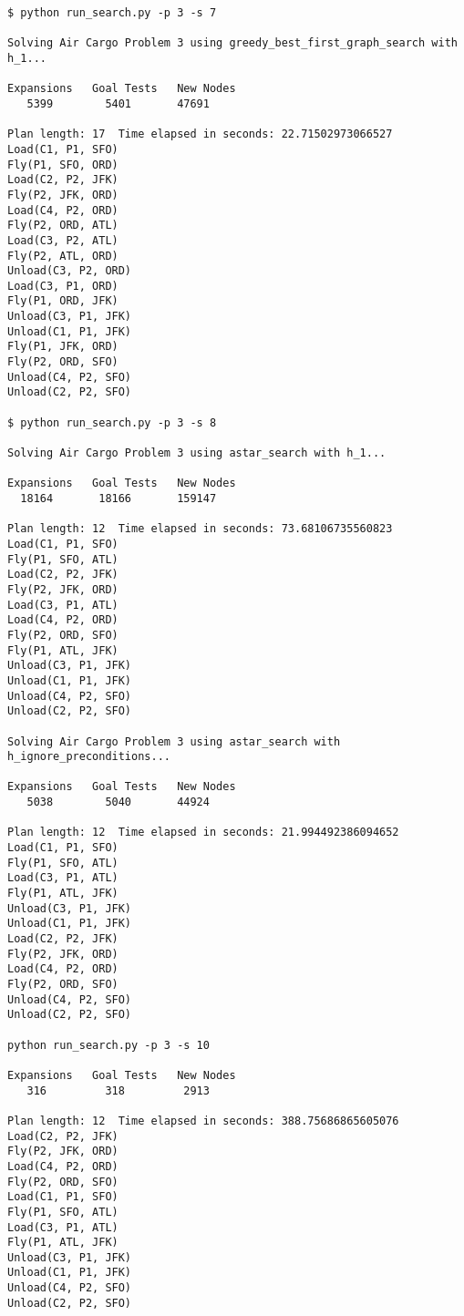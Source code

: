 \documentclass[11pt]{scrartcl}
\begin{document}
\begin{verbatim}
$ python run_search.py -p 3 -s 7

Solving Air Cargo Problem 3 using greedy_best_first_graph_search with h_1...

Expansions   Goal Tests   New Nodes
   5399        5401       47691

Plan length: 17  Time elapsed in seconds: 22.71502973066527
Load(C1, P1, SFO)
Fly(P1, SFO, ORD)
Load(C2, P2, JFK)
Fly(P2, JFK, ORD)
Load(C4, P2, ORD)
Fly(P2, ORD, ATL)
Load(C3, P2, ATL)
Fly(P2, ATL, ORD)
Unload(C3, P2, ORD)
Load(C3, P1, ORD)
Fly(P1, ORD, JFK)
Unload(C3, P1, JFK)
Unload(C1, P1, JFK)
Fly(P1, JFK, ORD)
Fly(P2, ORD, SFO)
Unload(C4, P2, SFO)
Unload(C2, P2, SFO)

$ python run_search.py -p 3 -s 8

Solving Air Cargo Problem 3 using astar_search with h_1...

Expansions   Goal Tests   New Nodes
  18164       18166       159147

Plan length: 12  Time elapsed in seconds: 73.68106735560823
Load(C1, P1, SFO)
Fly(P1, SFO, ATL)
Load(C2, P2, JFK)
Fly(P2, JFK, ORD)
Load(C3, P1, ATL)
Load(C4, P2, ORD)
Fly(P2, ORD, SFO)
Fly(P1, ATL, JFK)
Unload(C3, P1, JFK)
Unload(C1, P1, JFK)
Unload(C4, P2, SFO)
Unload(C2, P2, SFO)

Solving Air Cargo Problem 3 using astar_search with h_ignore_preconditions...

Expansions   Goal Tests   New Nodes
   5038        5040       44924

Plan length: 12  Time elapsed in seconds: 21.994492386094652
Load(C1, P1, SFO)
Fly(P1, SFO, ATL)
Load(C3, P1, ATL)
Fly(P1, ATL, JFK)
Unload(C3, P1, JFK)
Unload(C1, P1, JFK)
Load(C2, P2, JFK)
Fly(P2, JFK, ORD)
Load(C4, P2, ORD)
Fly(P2, ORD, SFO)
Unload(C4, P2, SFO)
Unload(C2, P2, SFO)

python run_search.py -p 3 -s 10

Expansions   Goal Tests   New Nodes
   316         318         2913

Plan length: 12  Time elapsed in seconds: 388.75686865605076
Load(C2, P2, JFK)
Fly(P2, JFK, ORD)
Load(C4, P2, ORD)
Fly(P2, ORD, SFO)
Load(C1, P1, SFO)
Fly(P1, SFO, ATL)
Load(C3, P1, ATL)
Fly(P1, ATL, JFK)
Unload(C3, P1, JFK)
Unload(C1, P1, JFK)
Unload(C4, P2, SFO)
Unload(C2, P2, SFO)
\end{verbatim}
    
\end{document}
